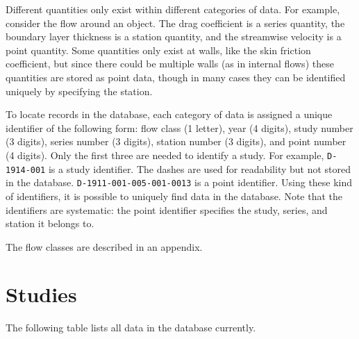 Different quantities only exist within different categories of data.  For
example, consider the flow around an object.  The drag coefficient is a series
quantity, the boundary layer thickness is a station quantity, and the
streamwise velocity is a point quantity.  Some quantities only exist at walls,
like the skin friction coefficient, but since there could be multiple walls (as
in internal flows) these quantities are stored as point data, though in many
cases they can be identified uniquely by specifying the station.

To locate records in the database, each category of data is assigned a unique
identifier of the following form: flow class (1 letter), year (4 digits), study
number (3 digits), series number (3 digits), station number (3 digits), and
point number (4 digits).  Only the first three are needed to identify a study.
For example, \texttt{D-1914-001} is a study identifier.  The dashes are used
for readability but not stored in the database.
\texttt{D-1911-001-005-001-0013} is a point identifier.  Using these kind of
identifiers, it is possible to uniquely find data in the database.  Note that
the identifiers are systematic: the point identifier specifies the study,
series, and station it belongs to.

The flow classes are described in an appendix.


\section{Studies}

The following table lists all data in the database currently.

\begin{center}
    \footnotesize
    
\end{center}
